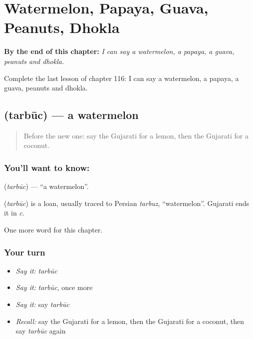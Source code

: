 
\chapter{Watermelon, Papaya, Guava, Peanuts, Dhokla}
\label{ch:gu-watermelon-papaya-guava-peanuts-dhokla}

\begin{chapteropening}
\textbf{By the end of this chapter:} \emph{I can say a watermelon, a papaya, a guava, peanuts and dhokla.}

Complete the last lesson of chapter 116: I can say a watermelon, a papaya, a guava, peanuts and dhokla.
\end{chapteropening}

\section[\texorpdfstring{\gu{તરબૂચ} (tarbūc)}{તરબૂચ (tarbūc)}]{ (tarbūc) — a watermelon}

\label{lesson:GU-C116-tarbuc}



\begin{quote}
Before the new one: say the Gujarati for a lemon, then the Gujarati for a coconut.
\end{quote}

\subsection*{You'll want to know: }
\textbf{} (\emph{tarbūc}) — \textquotedblleft{}a watermelon\textquotedblright{}.

\begin{cousinweb}
\textbf{} (\emph{tarbūc}) is a loan, usually traced to Persian \emph{tarbuz}, \textquotedblleft{}watermelon\textquotedblright{}. Gujarati ends it in \emph{c}.
\end{cousinweb}

\begin{grammarlens}[title={What you've built}]
One more word for this chapter.
\end{grammarlens}

\subsection*{Your turn}
\begin{itemize}
\raggedright
  \item \emph{Say it:} \emph{tarbūc}
  \item \emph{Say it:} \emph{tarbūc}, once more
  \item \emph{Say it:} say \emph{tarbūc}
  \item \emph{Recall:} say the Gujarati for a lemon, then the Gujarati for a coconut, then say \emph{tarbūc} again
\end{itemize}

